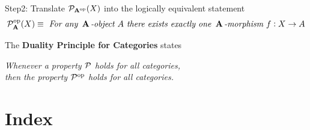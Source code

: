 \documentclass[11pt]{article}
\begin{document}
Step2: Translate \(\mathcal{P}_{\operatorname{\textbf{A}}^{\operatorname{op}}}(X)\) into the logically equivalent
statement
\begin{equation*}
\mathcal{P}_{\operatorname{\textbf{A}}}^{\operatorname{op}}(X)\equiv \textit{ For any } \operatorname{\textbf{A}}\textit{-object } A
\textit{ there exists exactly one }
\operatorname{\textbf{A}}\textit{-morphism } f:X\to A
\end{equation*}

The \textbf{Duality Principle for Categories} states
\begin{center}
\textit{Whenever a property \(\mathcal{P}\) holds for all categories,}\\
\textit{then the property \(\mathcal{P}^{\operatorname{op}}\) holds for all categories.}
\end{center}
\section{Index}
\label{sec:orgd7312ed}
\renewcommand{\indexname}{}
\printindex
\end{document}
